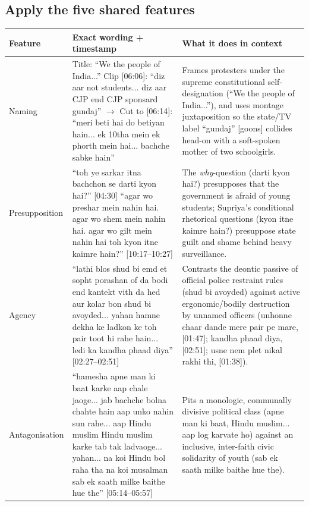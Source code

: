 \documentclass[10pt,a4paper]{article}
\begin{document}
\subsection*{Apply the five shared features}
\par\vspace{4pt}
{\small
\begin{longtable}{@{}>{\raggedright\arraybackslash}p{} >{\raggedright\arraybackslash}p{} >{\raggedright\arraybackslash}p{}@{}}
\toprule
\textbf{Feature} & \textbf{Exact wording + timestamp} & \textbf{What it does in context} \\
\midrule
\endhead
Naming & Title: ``We the people of India...'' \newline  Clip [06:06]: ``diz aar not students... diz aar CJP end CJP sponsard gundaj'' $\rightarrow$ Cut to [06:14]: ``meri beti hai do betiyan hain... ek 10tha mein ek phorth mein hai... bachche sabke hain'' & Frames protesters under the supreme constitutional self-designation (``We the people of India...''), and uses montage juxtaposition so the state/TV label ``gundaj'' [goons] collides head-on with a soft-spoken mother of two schoolgirls. \\
\addlinespace[6pt]
Presupposition & ``toh ye sarkar itna bachchon se darti kyon hai?'' [04:30] \newline  ``agar wo preshar mein nahin hai. agar wo shem mein nahin hai. agar wo gilt mein nahin hai toh kyon itne kaimre hain?'' [10:17--10:27] & The \emph{why}-question (darti kyon hai?) presupposes that the government is afraid of young students; Supriya's conditional rhetorical questions (kyon itne kaimre hain?) presuppose state guilt and shame behind heavy surveillance. \\
\addlinespace[6pt]
Agency & ``lathi blos shud bi emd et sopht porashan of da bodi end kantekt vith da hed aur kolar bon shud bi avoyded... yahan hamne dekha ke ladkon ke toh pair toot hi rahe hain... ledi ka kandha phaad diya'' [02:27--02:51] & Contrasts the deontic passive of official police restraint rules (shud bi avoyded) against active ergonomic/bodily destruction by unnamed officers (unhonne chaar dande mere pair pe mare, [01:47]; kandha phaad diya, [02:51]; usne nem plet nikal rakhi thi, [01:38]). \\
\addlinespace[6pt]
Antagonisation & ``hamesha apne man ki baat karke aap chale jaoge... jab bachche bolna chahte hain aap unko nahin sun rahe... aap Hindu muslim Hindu muslim karke tab tak ladvaoge... yahan... na koi Hindu bol raha tha na koi musalman sab ek saath milke baithe hue the'' [05:14--05:57] & Pits a monologic, communally divisive political class (apne man ki baat, Hindu muslim... aap log karvate ho) against an inclusive, inter-faith civic solidarity of youth (sab ek saath milke baithe hue the). \\

\end{longtable}}
\end{document}
